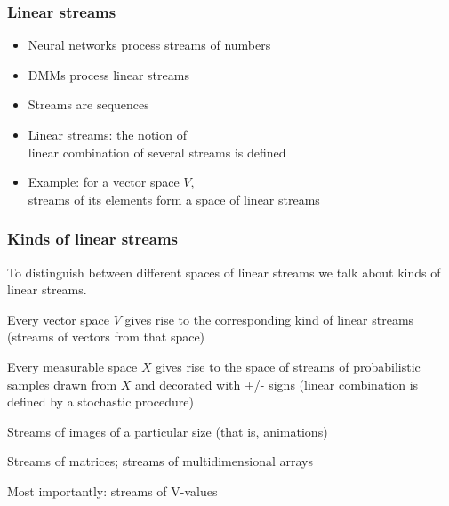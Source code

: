 \documentclass{beamer}
\newcommand{\msgray}[1]{{\color{mygray} #1}}
\begin{document}
\begin{frame}

\frametitle{Linear streams}

\begin{itemize}

\item Neural networks process streams of numbers\\[2ex]

\item DMMs process linear streams\\[2ex]

\item Streams are sequences\\[2ex]

\item Linear streams: the notion of\\ linear combination of several streams is defined\\[2ex]

\item Example: for a vector space $V$,\\ streams of its elements form a space of linear streams\\[2ex]

\end{itemize}

\end{frame}



\begin{frame}

\frametitle{Kinds of linear streams}

\begin{itemize}

\item To distinguish between different spaces of linear streams we talk about
kinds of linear streams.\\[2ex]

\msgray{\item Every vector space $V$ gives rise to the corresponding kind of linear streams
(streams of vectors from that space)\\[2ex]

\item Every measurable space $X$ gives rise to the space of streams of
probabilistic samples drawn from $X$ and decorated with +/- signs
(linear combination is defined by a stochastic procedure)\\[2ex]

\item Streams of images of a particular size (that is, animations)\\[2ex]

\item Streams of matrices; streams of multidimensional arrays\\[2ex]

\item Most importantly: streams of V-values\\[2ex]


}

\end{itemize}

\end{frame}
\end{document}
